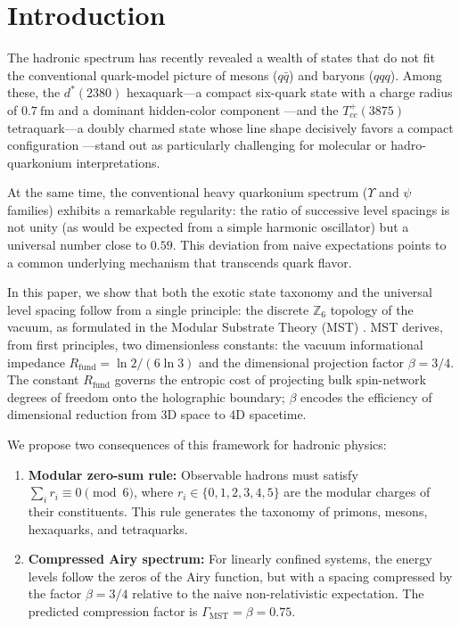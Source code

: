 \documentclass[12pt,a4paper]{article}
\theoremstyle{plain}
\theoremstyle{definition}
\theoremstyle{remark}
\begin{document}
\section{Introduction}
The hadronic spectrum has recently revealed a wealth of states that do not fit the conventional quark-model picture of mesons (\(q\bar{q}\)) and baryons (\(qqq\)). Among these, the \(d^*(2380)\) hexaquark---a compact six-quark state with a charge radius of \(0.7\ \text{fm}\) and a dominant hidden-color component \cite{Bashkanov2024, Lu2017}---and the \(T_{cc}^+(3875)\) tetraquark---a doubly charmed state whose line shape decisively favors a compact configuration \cite{Harada2025}---stand out as particularly challenging for molecular or hadro-quarkonium interpretations.

At the same time, the conventional heavy quarkonium spectrum (\(\Upsilon\) and \(\psi\) families) exhibits a remarkable regularity: the ratio of successive level spacings is not unity (as would be expected from a simple harmonic oscillator) but a universal number close to \(0.59\). This deviation from naive expectations points to a common underlying mechanism that transcends quark flavor.

In this paper, we show that both the exotic state taxonomy and the universal level spacing follow from a single principle: the discrete \(\mathbb{Z}_6\) topology of the vacuum, as formulated in the Modular Substrate Theory (MST) \cite{MSTfound}. MST derives, from first principles, two dimensionless constants: the vacuum informational impedance \(R_{\text{fund}} = \ln 2/(6\ln 3)\) and the dimensional projection factor \(\beta = 3/4\). The constant \(R_{\text{fund}}\) governs the entropic cost of projecting bulk spin-network degrees of freedom onto the holographic boundary; \(\beta\) encodes the efficiency of dimensional reduction from 3D space to 4D spacetime.

We propose two consequences of this framework for hadronic physics:

\begin{enumerate}[label=(\roman*)]
    \item \textbf{Modular zero-sum rule:} Observable hadrons must satisfy \(\sum_i r_i \equiv 0 \pmod{6}\), where \(r_i \in \{0,1,2,3,4,5\}\) are the modular charges of their constituents. This rule generates the taxonomy of primons, mesons, hexaquarks, and tetraquarks.
    \item \textbf{Compressed Airy spectrum:} For linearly confined systems, the energy levels follow the zeros of the Airy function, but with a spacing compressed by the factor \(\beta = 3/4\) relative to the naive non-relativistic expectation. The predicted compression factor is \(\Gamma_{\text{MST}} = \beta = 0.75\).
\end{enumerate}
\end{document}

